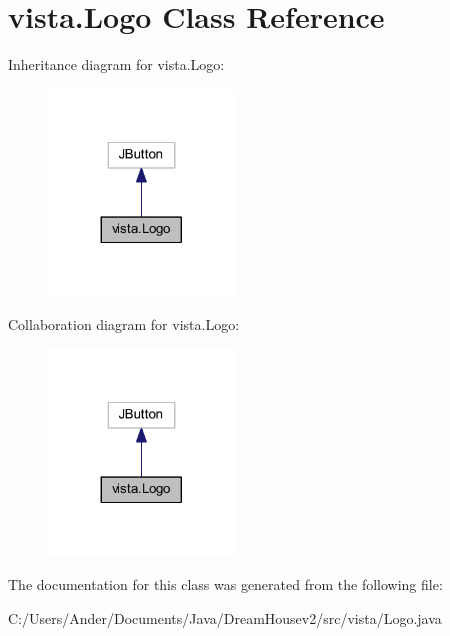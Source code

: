 \hypertarget{classvista_1_1_logo}{}\section{vista.\+Logo Class Reference}
\label{classvista_1_1_logo}


Inheritance diagram for vista.\+Logo\+:
\nopagebreak
\begin{figure}[H]
\begin{center}
\leavevmode
\includegraphics[width=140pt]{classvista_1_1_logo__inherit__graph}
\end{center}
\end{figure}


Collaboration diagram for vista.\+Logo\+:
\nopagebreak
\begin{figure}[H]
\begin{center}
\leavevmode
\includegraphics[width=140pt]{classvista_1_1_logo__coll__graph}
\end{center}
\end{figure}


The documentation for this class was generated from the following file\+:\begin{DoxyCompactItemize}
\item 
C\+:/\+Users/\+Ander/\+Documents/\+Java/\+Dream\+Housev2/src/vista/Logo.\+java\end{DoxyCompactItemize}
